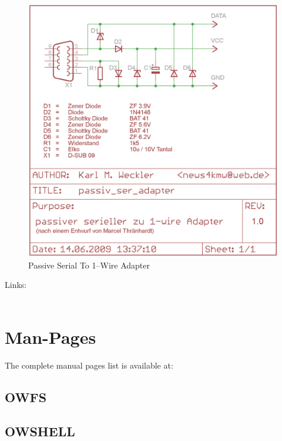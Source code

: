 \begin{figure}[htbp]
  \centering
  \includegraphics[width=\columnwidth]{passiv_ser_adapter}
  \caption{Passive Serial To 1--Wire Adapter}
  \label{fig:passiv_ser_adapter}
\end{figure}

Links:\\
 \\

\newpage

{
\section{Man-Pages}
}
The complete manual pages list is available at:

\subsection{OWFS}



\subsection{OWSHELL}

